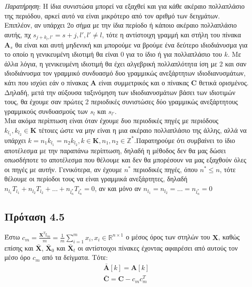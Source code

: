 \textit{Παρατήρηση}: Η ίδια συνιστώσα μπορεί να εξαχθεί και για κάθε ακέραιο πολλαπλάσιο της περιόδου, αρκεί αυτό να είναι μικρότερο από τον αριθμό των δειγμάτων. Επιπλέον, αν υπάρχει 2ο σήμα με την ίδια περίοδο ή κάποιο ακέραιο πολλαπλάσιο αυτής, πχ $s_{j+k_l,l'} = s+{j,l'}, l' \neq l$, τότε η αντίστοιχη γραμμή και στήλη του πίνακα $\mathbf{A}_s$ θα είναι και αυτή μηδενική και μπορούμε να βρούμε ένα δεύτερο ιδιοδιάνυσμα για το οποίο η γενικευμένη ιδιοτιμή θα είναι 0 για το ίδιο ή για πολλαπλάσιο του $k$. Με άλλα λόγια, η γενικευμένη ιδιοτιμή θα έχει αλγεβρική πολλαπλότητα ίση με 2 και σαν ιδιοδιάνυσμα τον γραμμικό συνδυασμό δυο γραμμικώς ανεξάρτητων ιδιοδιανυσμάτων, κάτι που ισχύει εάν ο πίνακας $\mathbf{A}$ είναι συμμετρικός και ο πίνακας $\mathbf{C}$ θετικά ορισμένος. Δηλαδή, μετά την αύξουσα ταξινόμηση των ιδιοδιανυσμάτων βάσει των ιδιοτιμών τους, θα έχουμε σαν πρώτες 2 περιοδικές συνιστώσες δύο γραμμικώς ανεξάρτητους γραμμικούς συνδυασμούς των $s_l$ και $s_{l'}$.
\\[0.5 \baselineskip]
Μια ακόμα περίπτωση είναι όταν έχουμε δυο περιοδικές πηγές με περιόδους $k_{l_1}, k_{l_2} \in \mathbf{K}$ τέτοιες ώστε να μην είναι η μια ακέραιο πολλαπλάσιο της άλλης, αλλά να υπάρχει $k = n_1 k_{l_1} = n_2 k_{l_2}, k \in \mathbf{K}, n_1, n_2 \in \mathbb{Z}^*$.Παρατηρούμε ότι συμβαίνει το ίδιο αποτέλεσμα με την παραπάνω περίπτωση, δηλαδή η μέθοδος δεν θα μας δώσει οπωσδήποτε το αποτέλεσμα που θέλουμε και δεν θα μπορέσουν να μας εξαχθούν όλες οι πηγές με αυτήν.
\newpage
\noindent Γενικότερα, αν έχουμε $n^*$ περιοδικές πηγές, όπου $n^* \leq n$, τότε θέλουμε οι περίοδοι τους να είναι γραμμικά ανεξάρτητες, δηλαδή $n_{l_1} T_{l_1} + n_{l_2} T_{l_2} + \ldots + n_{l_n^{*}} T_{l_n^{*}} = 0$, αν και μόνο αν $n_{l_1} = n_{l_2} = \ldots = n_{l_n^{*}} = 0$ 
\subsection*{\small{Πρόταση 4.5}}
Έστω $c_{m} = \frac{\mathbf{X}^T \mathbb{I}_{m}}{m} = \frac{1}{m} 
\sum\limits_{i=1}^{m} x_i, x_i \in \mathbb{R}^{n \times 1} $ ο μέσος όρος των στηλών του $\mathbf{X}$, καθώς επίσης και $\mathbf{\bar{X}}$, 
$\mathbf{\bar{X}}_0$ και $\mathbf{\bar{X}}_t$ οι αντίστοιχοι πίνακες έχοντας αφαιρέσει από αυτούς τον μέσο όρο $c_m$ από τα δείγματα. Τότε:
\begin{align} 
    \mathbf{\bar{A}}[k] = \mathbf{A}[k] \label{eq:4.2.1} \\
    \mathbf{\bar{C}} = \mathbf{C} - c_m c_m^T \label{eq:4.2.2}
\end{align}
